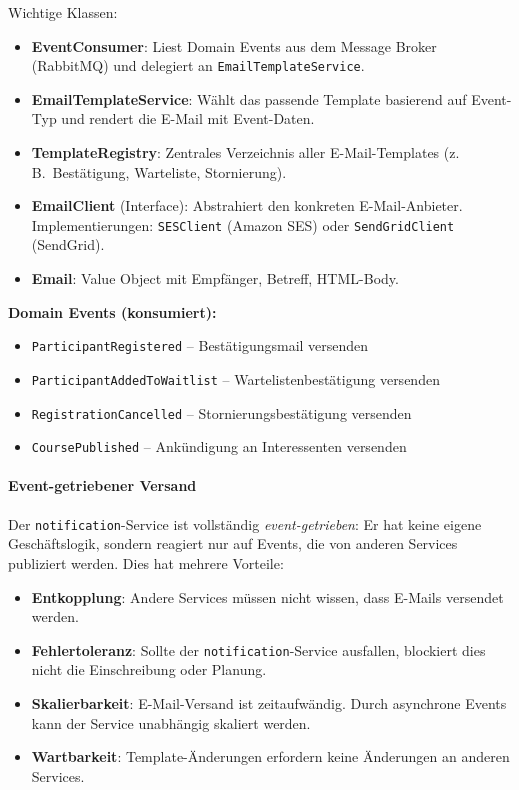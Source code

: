 Wichtige Klassen:
\begin{itemize}[leftmargin=1.5em]
  \item \textbf{EventConsumer}: Liest Domain Events aus dem
  Message Broker (RabbitMQ) und delegiert an
  \texttt{EmailTemplateService}.
  \item \textbf{EmailTemplateService}: Wählt das passende
  Template basierend auf Event-Typ und rendert die
  E-Mail mit Event-Daten.
  \item \textbf{TemplateRegistry}: Zentrales Verzeichnis aller
  E-Mail-Templates (z.\,B.\ Bestätigung, Warteliste,
  Stornierung).
  \item \textbf{EmailClient} (Interface): Abstrahiert den
  konkreten E-Mail-Anbieter. Implementierungen:
  \texttt{SESClient} (Amazon SES) oder
  \texttt{SendGridClient} (SendGrid).
  \item \textbf{Email}: Value Object mit Empfänger, Betreff,
  HTML-Body.
\end{itemize}

\noindent\textbf{Domain Events (konsumiert):}
\begin{itemize}[leftmargin=1.5em, label=\raisebox{0.25ex}{\tiny\(\bullet\)}]
  \item \texttt{ParticipantRegistered} -- Bestätigungsmail versenden
  \item \texttt{ParticipantAddedToWaitlist} -- Wartelistenbestätigung versenden
  \item \texttt{RegistrationCancelled} -- Stornierungsbestätigung versenden
  \item \texttt{CoursePublished} -- Ankündigung an Interessenten versenden
\end{itemize}

\paragraph{Event-getriebener Versand}

Der \texttt{notification}-Service ist vollständig
\emph{event-getrieben}: Er hat keine eigene Geschäftslogik,
sondern reagiert nur auf Events, die von anderen Services
publiziert werden. Dies hat mehrere Vorteile:

\begin{itemize}[leftmargin=1.5em]
  \item \textbf{Entkopplung}: Andere Services müssen nicht
  wissen, dass E-Mails versendet werden.
  \item \textbf{Fehlertoleranz}: Sollte der
  \texttt{notification}-Service ausfallen, blockiert
  dies nicht die Einschreibung oder Planung.
  \item \textbf{Skalierbarkeit}: E-Mail-Versand ist
  zeitaufwändig. Durch asynchrone Events kann der
  Service unabhängig skaliert werden.
  \item \textbf{Wartbarkeit}: Template-Änderungen erfordern
  keine Änderungen an anderen Services.
\end{itemize}

